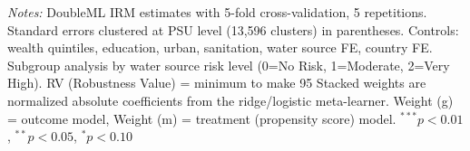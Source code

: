 \begin{table}[htbp]
\begin{tabular}{lccccccc}
\midrule
\bottomrule
\end{tabular}
\begin{minipage}{\textwidth}
\footnotesize
\textit{Notes:} DoubleML IRM estimates with 5-fold cross-validation, 5 repetitions. 
Standard errors clustered at PSU level (13,596 clusters) in parentheses. 
Controls: wealth quintiles, education, urban, sanitation, water source FE, country FE. 
Subgroup analysis by water source risk level (0=No Risk, 1=Moderate, 2=Very High). 
RV (Robustness Value) = minimum %
to make 95%
Stacked weights are normalized absolute coefficients from the ridge/logistic meta-learner. 
Weight (g) = outcome model, Weight (m) = treatment (propensity score) model. 
$^{***}p<0.01$, $^{**}p<0.05$, $^{*}p<0.10$
\end{minipage}
\end{table}